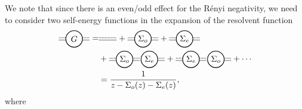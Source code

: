 \documentclass[aps,pra,groupedaddress,onecolumn,notitlepage,superscriptaddress,10pt]{revtex4-1}
\begin{document}
We note that since there is an even/odd effect for the R\'enyi negativity, we need to consider two self-energy functions in the expansion of the resolvent function
\begin{align}
    \tikz[baseline=-0.5ex]{
    \draw[densely dotted,thick] (0.35,0.05)--(0.65,0.05);
    \draw[densely dotted,thick] (-0.35,0.05)--(-0.65,0.05);
    \draw (0.35,-0.05)--(0.65,-0.05);
    \draw (-0.35,-0.05)--(-0.65,-0.05);
    \draw[thick] (0,0) circle (10pt) node[anchor=center] {$G$};
    }
    =&
   \tikz[baseline=-0.5ex]{
    \draw[densely dotted,thick] (-0.4,0.05)--(0.35,0.05);
    \draw (-0.4,-0.05)--(0.35,-0.05);
    }
    +
    \tikz[baseline=-0.5ex]{
    \draw[densely dotted,thick] (0.35,0.05)--(0.65,0.05);
    \draw[densely dotted,thick] (-0.35,0.05)--(-0.65,0.05);
    \draw (0.35,-0.05)--(0.65,-0.05);
    \draw (-0.35,-0.05)--(-0.65,-0.05);
    \draw[thick] (0,0) circle (10pt) node[anchor=center] {$\Sigma_o$};
    }
    +
    \tikz[baseline=-0.5ex]{
    \draw[densely dotted,thick] (0.35,0.05)--(0.65,0.05);
    \draw[densely dotted,thick] (-0.35,0.05)--(-0.65,0.05);
    \draw (0.35,-0.05)--(0.65,-0.05);
    \draw (-0.35,-0.05)--(-0.65,-0.05);
    \draw[thick] (0,0) circle (10pt) node[anchor=center] {$\Sigma_e$};
    }
    \nonumber \\
    &+
    \tikz[baseline=-0.5ex]{
    \draw[densely dotted,thick] (0.35,0.05)--(0.65,0.05);
    \draw[densely dotted,thick] (-0.35,0.05)--(-0.65,0.05);
    \draw (0.35,-0.05)--(0.65,-0.05);
    \draw (-0.35,-0.05)--(-0.65,-0.05);
    \draw[thick] (0,0) circle (10pt) node[anchor=center] {$\Sigma_o$};
    \draw[thick] (1.05,0) circle (10pt) node[anchor=center] {$\Sigma_e$};
    \draw[densely dotted,thick] (1.4,0.05)--(1.7,0.05);
    \draw (1.4,-0.05)--(1.7,-0.05);
    }
+
   \tikz[baseline=-0.5ex]{
    \draw[densely dotted,thick] (0.35,0.05)--(0.65,0.05);
    \draw[densely dotted,thick] (-0.35,0.05)--(-0.65,0.05);
    \draw (0.35,-0.05)--(0.65,-0.05);
    \draw (-0.35,-0.05)--(-0.65,-0.05);
    \draw[thick] (0,0) circle (10pt) node[anchor=center] {$\Sigma_e$};
    \draw[thick] (1.05,0) circle (10pt) node[anchor=center] {$\Sigma_o$};
    \draw[densely dotted,thick] (1.4,0.05)--(1.7,0.05);
    \draw (1.4,-0.05)--(1.7,-0.05);
    }
    + \cdots \nonumber \\
      &=\frac{1}{z- \Sigma_o(z) - \Sigma_e(z)},
      \label{eq:geometric}
\end{align}
where 
\end{document}
